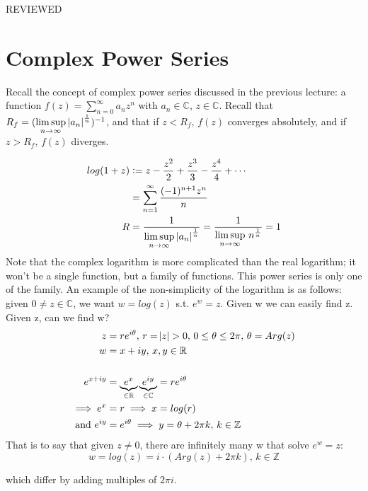 
\setcounter{section}{0}
\setcounter{theorem}{0}


REVIEWED
\section{Complex Power Series}

Recall the concept of complex power series discussed in the previous lecture: a function $f(z) = \sum_{n=0}^\infty a_nz^n$ with $a_n \in \mathbb{C}$, $z\in \mathbb{C}$. Recall that $R_f=( \limsup\limits_{n\rightarrow \infty} \, \abs{a_n}^\frac{1}{n} )^{-1}$, and that if $z<R_f, \, f(z)$ converges absolutely, and if $z>R_f$, $f(z)$ diverges.

\begin{example}[Logarithm]
\begin{align*}
    log(1+z) & \vcentcolon = z - \frac{z^2}{2} +\frac{z^3}{3} - \frac{z^4}{4} + \cdots\\
    &= \sum_{n=1}^\infty \frac{(-1)^{n+1}z^n}{n}\\
    R&=\frac{1}{\limsup\limits_{n\rightarrow \infty} \, \abs{a_n}^\frac{1}{n}} = \frac{1}{\limsup\limits_{n\rightarrow \infty} \, n^\frac{1}{n}} = 1
\end{align*}
Note that the complex logarithm is more complicated than the real logarithm; it won't be a single function, but a family of functions. This power series is only one of the family. An example of the non-simplicity of the logarithm is as follows: given $0 \neq z \in \mathbb{C}$, we want $w=log(z)$ s.t. $e^w=z$. Given w we can easily find z. Given z, can we find w?
\begin{align*}
    z&=re^{i\theta}, \, r=\abs{z}>0, \, 0 \leq \theta \leq 2\pi, \, \theta = Arg(z)\\
    w&=x+iy, \, x,y\in \mathbb{R}\\\\
    e^{x+iy} &= 
    \underbrace{e^x}_{\in \mathbb{R}} \underbrace{e^{iy}}_{\in \mathbb{C}} = re^{i\theta}\\ \implies e^x &=r \implies x=log(r)\\
   \text{and } e^{iy} &= e^{i\theta} \implies y = \theta +2\pi k, \, k\in \mathbb{Z}
\end{align*}
That is to say that given $z\neq 0$, there are infinitely many w that solve $e^w=z$:
$$w = log(z) = i\cdot (Arg(z) +2\pi k), \, k\in \mathbb{Z}$$

which differ by adding multiples of $2 \pi i$.
\end{example}

